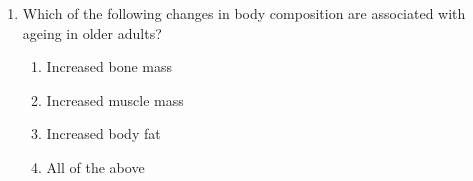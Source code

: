 \documentclass[12pt]{article}
\begin{document}
\begin{enumerate}[label=\arabic*.]
\begin{enumerate}[label=(\alph*)]
    \item The amino acid requirements determined for adults is assumed to be the requirement pattern for all ages.
    \item The amino acid requirements determined for adults is assumed to be the requirements for maintenance for all ages.
    \item The amino acid pattern of breast milk is assumed to be the requirement pattern for all children.
    \item The amino acid pattern of human tissue protein is assumed to be the requirement patterns for infants and young children.
\end{enumerate}
\item Which of the following changes in body composition are associated with ageing in older adults?
\begin{enumerate}[label=(\alph*)]
    \item Increased bone mass
    \item Increased muscle mass
    \item Increased body fat
    \item All of the above
\end{enumerate}
\end{enumerate}
\end{document}
